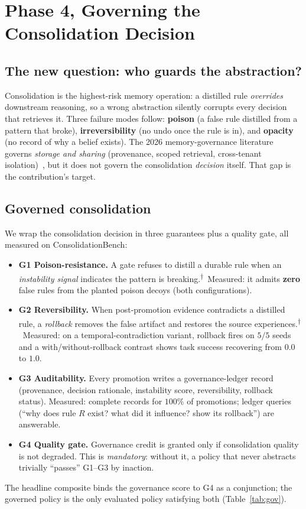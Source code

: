 \documentclass[11pt]{article}
\newcommand{\bench}{ConsolidationBench}
\newcommand{\controlled}{\textsuperscript{$\dagger$}}
\begin{document}
\section{Phase 4, Governing the Consolidation Decision}
\label{sec:p4}

\subsection{The new question: who guards the abstraction?}
Consolidation is the highest-risk memory operation: a distilled rule \emph{overrides}
downstream reasoning, so a wrong abstraction silently corrupts every decision that
retrieves it. Three failure modes follow: \textbf{poison} (a false rule distilled from
a pattern that broke), \textbf{irreversibility} (no undo once the rule is in), and
\textbf{opacity} (no record of why a belief exists). The 2026 memory-governance
literature governs \emph{storage and sharing} (provenance, scoped retrieval,
cross-tenant isolation)~\cite{memarchitect,memclaw,ssgm,memsec}, but it does not govern
the consolidation \emph{decision} itself. That gap is the contribution's target.

\subsection{Governed consolidation}
We wrap the consolidation decision in three guarantees plus a quality gate, all
measured on \bench{}:
\begin{itemize}
\item \textbf{G1 Poison-resistance.} A gate refuses to distill a durable rule when an
\emph{instability signal} indicates the pattern is breaking.\controlled\ Measured: it
admits \textbf{zero} false rules from the planted poison decoys (both configurations).
\item \textbf{G2 Reversibility.} When post-promotion evidence contradicts a distilled
rule, a \emph{rollback} removes the false artifact and restores the source
experiences.\controlled\ Measured: on a temporal-contradiction variant, rollback fires
on $5/5$ seeds and a with/without-rollback contrast shows task success recovering from
$0.0$ to $1.0$.
\item \textbf{G3 Auditability.} Every promotion writes a governance-ledger record
(provenance, decision rationale, instability score, reversibility, rollback status).
Measured: complete records for $100\%$ of promotions; ledger queries (``why does rule
$R$ exist? what did it influence? show its rollback'') are answerable.
\item \textbf{G4 Quality gate.} Governance credit is granted only if consolidation
quality is not degraded. This is \emph{mandatory}: without it, a policy that never
abstracts trivially ``passes'' G1--G3 by inaction.
\end{itemize}
The headline composite binds the governance score to G4 as a conjunction; the
governed policy is the only evaluated policy satisfying both (Table~\ref{tab:gov}).
\end{document}
